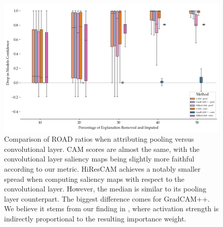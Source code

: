 \begin{figure}
    \begin{center}
    \begin{minipage}{1\textwidth}
      \includegraphics[width=\textwidth]{img/road-conv-vs-pool.png}
    \end{minipage}
    \caption{Comparison of ROAD ratios when attributing pooling versus convolutional layer. CAM scores are almost the same, with the convolutional layer saliency maps being slightly more faithful according to our metric. HiResCAM achieves a notably smaller spread when computing saliency maps with respect to the convolutional layer. However, the median is similar to its pooling layer counterpart. The biggest difference comes for GradCAM++. We believe it stems from our finding in , where activation strength is indirectly proportional to the resulting importance weight.}
    \label{fig:road-conv-vs-pool}
    \end{center}
\end{figure}

